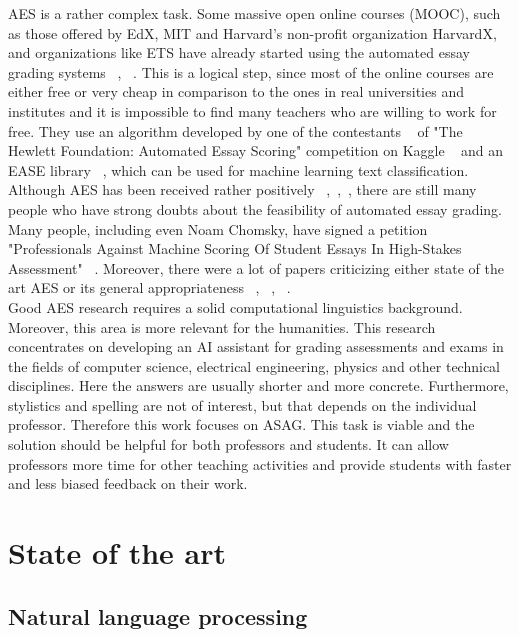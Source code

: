 \documentclass[11pt]{report}
\numberwithin{equation}{section} %
\begin{document}
AES is a rather complex task. Some massive open online courses (MOOC), such as those offered by EdX, MIT and Harvard's non-profit organization HarvardX, and organizations like ETS have already started using the automated essay grading systems  ~\cite{Balfour}, ~\cite{aesOverview}. This is a logical step, since most of the online courses are either free or very cheap in comparison to the ones in real universities and institutes and it is impossible to find many teachers who are willing to work for free. They use an algorithm developed by one of the contestants ~\cite{vikGit} of "The Hewlett Foundation: Automated Essay Scoring" competition on Kaggle ~\cite{HewlettKaggle} and an EASE library ~\cite{edxGit}, which can be used for machine learning text classification. Although AES has been received rather positively ~\cite{aesOverview},~\cite{Shermis},~\cite{Alikaniotis}, there are still many people who have strong doubts about the feasibility of automated essay grading. Many people, including even Noam Chomsky, have signed a petition "Professionals Against Machine Scoring Of Student Essays In High-Stakes Assessment" ~\cite{petition}. Moreover, there were a lot of papers criticizing either state of the art AES or its general appropriateness ~\cite{Perelman}, ~\cite{Byrne}, ~\cite{Ramineni}.\\

Good AES research requires a solid computational linguistics background. Moreover, this area is more relevant for the humanities. This research concentrates on developing an AI assistant for grading assessments and exams in the fields of computer science, electrical engineering, physics and other technical disciplines. Here the answers are usually shorter and more concrete. Furthermore, stylistics and spelling are not of interest, but that depends on the individual professor. Therefore this work focuses on ASAG. This task is viable and the solution should be helpful for both professors and students. It can allow professors more time for other teaching activities and provide students with faster and less biased feedback on their work.

 
\chapter{\textbf{State of the art}}

\section{\textbf{Natural language processing}}
\end{document}
